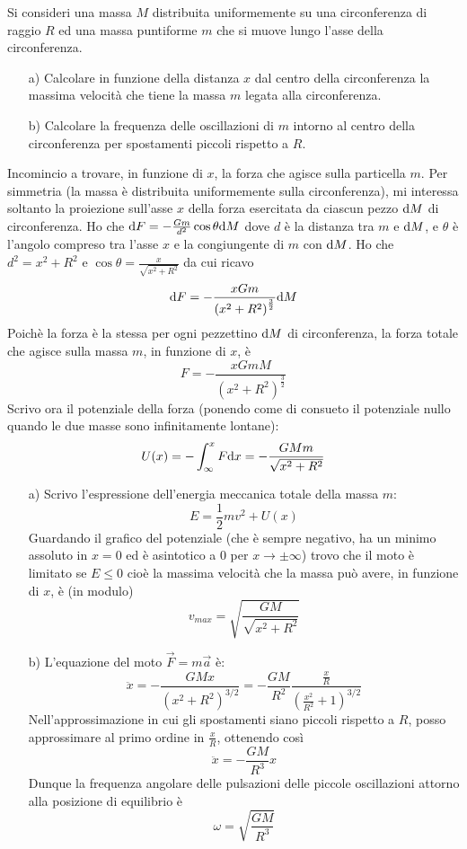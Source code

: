\documentclass[../main.tex]{subfiles}
\begin{document}

\textex
Si consideri una massa $M$ distribuita uniformemente su una circonferenza di raggio $R$ ed una massa puntiforme $m$ che si muove lungo l'asse della circonferenza.
\begin{itemize}
\item[a)] Calcolare in funzione della distanza $x$ dal centro della circonferenza la massima velocità che tiene la massa $m$ legata alla circonferenza.
\item[b)] Calcolare la frequenza delle oscillazioni di $m$ intorno al centro della circonferenza per spostamenti piccoli rispetto a $R$.
\end{itemize}

\solution
Incomincio a trovare, in funzione di $x$, la forza che agisce sulla particella $m$.
Per simmetria (la massa è distribuita uniformemente sulla circonferenza), mi interessa soltanto la proiezione sull'asse $x$ della forza esercitata da ciascun pezzo $\mathrm{d} M$ di circonferenza.
Ho che $\mathrm{d} F = -\frac{Gm}{d^2}\cos\theta \mathrm{d} M$ dove $d$ è la distanza tra $m$ e $\mathrm{d} M$, e $\theta$ è l'angolo compreso tra l'asse $x$ e la congiungente di $m$ con $\mathrm{d} M$. Ho che $d^2 = x^2 + R^2$ e $\cos\theta = \frac{x}{\sqrt{x^2+R^2}}$ da cui ricavo
$$ \mathrm{d} F = -\frac{xGm}{\left ( x^2+R^2\right )^{\frac{3}{2}}}\mathrm{d} M$$
Poichè la forza è la stessa per ogni pezzettino $\mathrm{d} M$ di circonferenza, la forza totale che agisce sulla massa $m$, in funzione di $x$, è
$$ F = -\frac{xGmM}{\left ( x^2+R^2\right )^{\frac{3}{2}}}$$
Scrivo ora il potenziale della forza (ponendo come di consueto il potenziale nullo quando le due masse sono infinitamente lontane): $$U(x) = -\int_{\infty}^{x} F \mathrm{d} x = -\frac{GMm}{\sqrt{x^2+R^2}} $$

\begin{itemize}
\item[a)] Scrivo l'espressione dell'energia meccanica totale della massa $m$:
$$ E = \frac{1}{2} m v^2+U(x)$$
Guardando il grafico del potenziale (che è sempre negativo, ha un minimo assoluto in $x=0$ ed è asintotico a 0 per $x\rightarrow \pm\infty$) trovo che il moto è limitato se $E\le 0$ cioè la massima velocità che la massa può avere, in funzione di $x$, è (in modulo)
$$ {v_{max}} = \sqrt{\frac{GM}{\sqrt{x^2+R^2}}} $$

\item[b)] L'equazione del moto $\overrightarrow F = m\overrightarrow a$ è: $$\ddot x = -\frac{GMx}{\left ( x^2+R^2\right )^{3/2}} = -\frac{GM}{R^2} \frac{\frac{x}{R}}{\left ( \frac{x^2}{R^2} + 1 \right ) ^{3/2}} $$
Nell'approssimazione in cui gli spostamenti siano piccoli rispetto a $R$, posso approssimare al primo ordine in $\frac{x}{R}$, ottenendo così $$\ddot x = -\frac{GM}{R^3}x $$
Dunque la frequenza angolare delle pulsazioni delle piccole oscillazioni attorno alla posizione di equilibrio è $$ \omega = \sqrt{\frac{GM}{R^3}} $$
\end{itemize}
\end{document}
